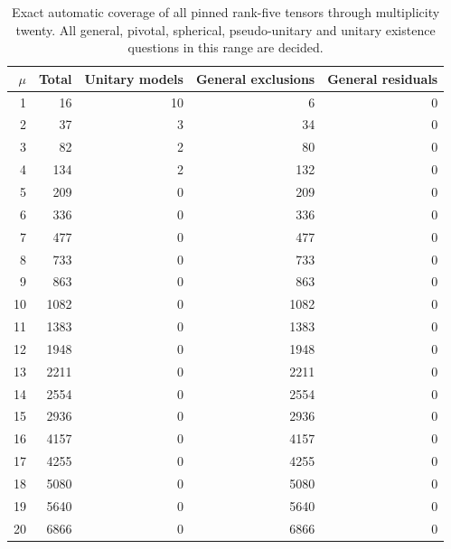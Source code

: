 \begin{table}[ht]\centering\small
\begin{tabular}{rrrrr}\toprule
$\mu$&Total&Unitary models&General exclusions&General residuals\\\midrule
1&16&10&6&0\\
2&37&3&34&0\\
3&82&2&80&0\\
4&134&2&132&0\\
5&209&0&209&0\\
6&336&0&336&0\\
7&477&0&477&0\\
8&733&0&733&0\\
9&863&0&863&0\\
10&1082&0&1082&0\\
11&1383&0&1383&0\\
12&1948&0&1948&0\\
13&2211&0&2211&0\\
14&2554&0&2554&0\\
15&2936&0&2936&0\\
16&4157&0&4157&0\\
17&4255&0&4255&0\\
18&5080&0&5080&0\\
19&5640&0&5640&0\\
20&6866&0&6866&0\\
\bottomrule\end{tabular}
\caption{Exact automatic coverage of all pinned rank-five tensors through multiplicity twenty. All general, pivotal, spherical, pseudo-unitary and unitary existence questions in this range are decided.}\label{tab:coverage}\end{table}
